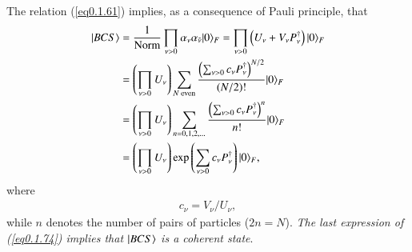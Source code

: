  The relation (\ref{eq0.1.61}) implies, as a consequence of Pauli principle, that 
\begin{align}\label{eq0.1.74}
\nonumber |{BCS} \rangle&=\frac{1}{\text{Norm}}\prod_{\nu>0}\alpha_\nu\alpha_{\tilde\nu}|{0} \rangle_F=\prod_{\nu>0}\left(U_\nu+V_\nu P^\dagger_\nu\right)|{0} \rangle_F\\
\nonumber&=\left(\prod_{\nu>0}U_{\nu}\right)\sum_{N\text{ even}} \frac{\left(\sum_{\nu>0}c_\nu P_\nu^\dagger\right)^{N/2}}{(N/2)!}|{0} \rangle_F\\
\nonumber&=\left(\prod_{\nu>0}U_\nu\right)\sum_{n=0,1,2,\dots}\frac{\left(\sum_{\nu>0}c_\nu P^\dagger_\nu\right)^n}{n!}|{0} \rangle_F\\
&=\left(\prod_{\nu>0}U_\nu\right)\exp\left(\sum_{\nu>0}c_\nu P^\dagger_\nu\right)|{0} \rangle_F,
\end{align}
 where
\begin{align}\label{eq0.1.75}
c_\nu=V_\nu/U_\nu,
\end{align}
while $n$ denotes the number of pairs of particles ($2n=N$). \textit{The last expression of (\ref{eq0.1.74}) implies that $|{BCS} \rangle$ is a coherent state}.


